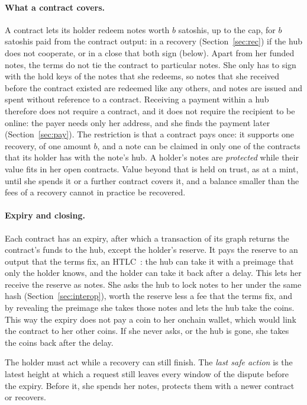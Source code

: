 \documentclass[11pt]{article}
\begin{document}
\paragraph{What a contract covers.} A contract lets its holder redeem notes worth $b$ satoshis, up to the cap, for $b$ satoshis paid from the contract output: in a recovery (Section~\ref{sec:rec}) if the hub does not cooperate, or in a close that both sign (below). Apart from her funded notes, the terms do not tie the contract to particular notes. She only has to sign with the hold keys of the notes that she redeems, so notes that she received before the contract existed are redeemed like any others, and notes are issued and spent without reference to a contract. Receiving a payment within a hub therefore does not require a contract, and it does not require the recipient to be online: the payer needs only her address, and she finds the payment later (Section~\ref{sec:pay}). The restriction is that a contract pays once: it supports one recovery, of one amount $b$, and a note can be claimed in only one of the contracts that its holder has with the note's hub. A holder's notes are \emph{protected} while their value fits in her open contracts. Value beyond that is held on trust, as at a mint, until she spends it or a further contract covers it, and a balance smaller than the fees of a recovery cannot in practice be recovered.

\paragraph{Expiry and closing.} Each contract has an expiry, after which a transaction of its graph returns the contract's funds to the hub, except the holder's reserve. It pays the reserve to an output that the terms fix, an HTLC~\cite{htlc}: the hub can take it with a preimage that only the holder knows, and the holder can take it back after a delay. This lets her receive the reserve as notes. She asks the hub to lock notes to her under the same hash (Section~\ref{sec:interop}), worth the reserve less a fee that the terms fix, and by revealing the preimage she takes those notes and lets the hub take the coins. This way the expiry does not pay a coin to her onchain wallet, which would link the contract to her other coins. If she never asks, or the hub is gone, she takes the coins back after the delay.

The holder must act while a recovery can still finish. The \emph{last safe action} is the latest height at which a request still leaves every window of the dispute before the expiry. Before it, she spends her notes, protects them with a newer contract or recovers.
\end{document}
